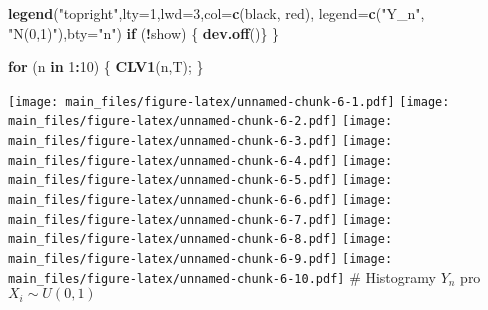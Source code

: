 \documentclass[
]{article}
\newenvironment{Shaded}{\begin{snugshade}}{\end{snugshade}}
\newcommand{\AttributeTok}[1]{\textcolor[rgb]{0.13,0.29,0.53}{#1}}
\newcommand{\ControlFlowTok}[1]{\textcolor[rgb]{0.13,0.29,0.53}{\textbf{#1}}}
\newcommand{\DecValTok}[1]{\textcolor[rgb]{0.00,0.00,0.81}{#1}}
\newcommand{\FunctionTok}[1]{\textcolor[rgb]{0.13,0.29,0.53}{\textbf{#1}}}
\newcommand{\NormalTok}[1]{#1}
\newcommand{\SpecialCharTok}[1]{\textcolor[rgb]{0.81,0.36,0.00}{\textbf{#1}}}
\newcommand{\StringTok}[1]{\textcolor[rgb]{0.31,0.60,0.02}{#1}}
\begin{document}
\begin{Shaded}
\begin{Highlighting}[]
  \FunctionTok{legend}\NormalTok{(}\StringTok{"topright"}\NormalTok{,}\AttributeTok{lty=}\DecValTok{1}\NormalTok{,}\AttributeTok{lwd=}\DecValTok{3}\NormalTok{,}\AttributeTok{col=}\FunctionTok{c}\NormalTok{(}\StringTok{\textquotesingle{}black\textquotesingle{}}\NormalTok{, }\StringTok{\textquotesingle{}red\textquotesingle{}}\NormalTok{),}
       \AttributeTok{legend=}\FunctionTok{c}\NormalTok{(}\StringTok{"Y\_n"}\NormalTok{, }\StringTok{"N(0,1)"}\NormalTok{),}\AttributeTok{bty=}\StringTok{"n"}\NormalTok{)  }
  \ControlFlowTok{if}\NormalTok{ (}\SpecialCharTok{!}\NormalTok{show) \{ }\FunctionTok{dev.off}\NormalTok{()\}}
\NormalTok{\}}
\end{Highlighting}
\end{Shaded}

\begin{Shaded}
\begin{Highlighting}[]
\ControlFlowTok{for}\NormalTok{ (n }\ControlFlowTok{in} \DecValTok{1}\SpecialCharTok{:}\DecValTok{10}\NormalTok{) \{ }\FunctionTok{CLV1}\NormalTok{(n,T); \}}
\end{Highlighting}
\end{Shaded}

\texttt{[image: main\_files/figure-latex/unnamed-chunk-6-1.pdf]}
\texttt{[image: main\_files/figure-latex/unnamed-chunk-6-2.pdf]}
\texttt{[image: main\_files/figure-latex/unnamed-chunk-6-3.pdf]}
\texttt{[image: main\_files/figure-latex/unnamed-chunk-6-4.pdf]}
\texttt{[image: main\_files/figure-latex/unnamed-chunk-6-5.pdf]}
\texttt{[image: main\_files/figure-latex/unnamed-chunk-6-6.pdf]}
\texttt{[image: main\_files/figure-latex/unnamed-chunk-6-7.pdf]}
\texttt{[image: main\_files/figure-latex/unnamed-chunk-6-8.pdf]}
\texttt{[image: main\_files/figure-latex/unnamed-chunk-6-9.pdf]}
\texttt{[image: main\_files/figure-latex/unnamed-chunk-6-10.pdf]} \#
Histogramy \(Y_n\) pro \(X_i \sim U(0,1)\)
\end{document}
